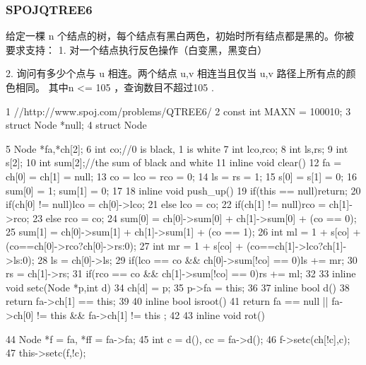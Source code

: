 \documentclass[11pt]{article}
\begin{document}
\subsubsection{SPOJQTREE6}

\begin{Code}
      给定一棵 n 个结点的树，每个结点有黑白两色，初始时所有结点都是黑的。你被要求支持：
      1. 对一个结点执行反色操作（白变黑，黑变白）


     2. 询问有多少个点与 u 相连。两个结点 u,v 相连当且仅当 u,v 路径上所有点的颜色相同。
     其中n <= 105 ，查询数目不超过105 .

 1   //http://www.spoj.com/problems/QTREE6/
 2   const int MAXN = 100010;
 3   struct Node *null;
 4   struct Node{
 5       Node *fa,*ch[2];
 6       int co;//0 is black, 1 is white
 7       int lco,rco;
 8       int ls,rs;
 9       int s[2];
10       int sum[2];//the sum of black and white
11       inline void clear(){
12           fa = ch[0] = ch[1] = null;
13           co = lco = rco = 0;
14           ls = rs = 1;
15           s[0] = s[1] = 0;
16           sum[0] = 1; sum[1] = 0;
17       }
18       inline void push_up(){
19           if(this == null)return;
20           if(ch[0] != null)lco = ch[0]->lco;
21           else lco = co;
22           if(ch[1] != null)rco = ch[1]->rco;
23           else rco = co;
24           sum[0] = ch[0]->sum[0] + ch[1]->sum[0] + (co == 0);
25           sum[1] = ch[0]->sum[1] + ch[1]->sum[1] + (co == 1);
26           int ml = 1 + s[co] + (co==ch[0]->rco?ch[0]->rs:0);
27           int mr = 1 + s[co] + (co==ch[1]->lco?ch[1]->ls:0);
28           ls = ch[0]->ls;
29           if(lco == co && ch[0]->sum[!co] == 0)ls += mr;
30           rs = ch[1]->rs;
31           if(rco == co && ch[1]->sum[!co] == 0)rs += ml;
32       }
33       inline void setc(Node *p,int d){
34           ch[d] = p;
35           p->fa = this;
36       }
37       inline bool d(){
38           return fa->ch[1] == this;
39       }
40       inline bool isroot(){
41           return fa == null || fa->ch[0] != this && fa->ch[1] != this
                ;
42       }
43       inline void rot(){
44           Node *f = fa, *ff = fa->fa;
45           int c = d(), cc = fa->d();
46           f->setc(ch[!c],c);
47           this->setc(f,!c);


}}
\end{Code}
\end{document}
